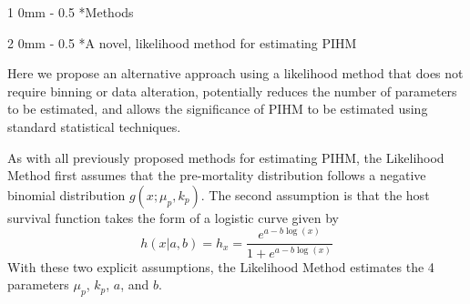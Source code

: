 \documentclass[12pt, a4paper]{article}
\makeatletter
\renewcommand{\section}{\@startsection
{section}%
{1}%
{0mm}%
{-\baselineskip}%
{0.5\baselineskip}%
{\normalfont\bf\large}} %
\renewcommand{\subsection}{\@startsection
{subsection}%
{2}%
{0mm}%
{-\baselineskip}%
{0.5\baselineskip}%
{\normalfont\bf}} %
\makeatother
\begin{document}


\section*{Methods}

\subsection*{A novel, likelihood method for estimating PIHM}

Here we propose an alternative approach using a likelihood method that does not
require binning or data alteration, potentially reduces the number of
parameters to be estimated, and allows the significance of PIHM to be estimated
using standard statistical techniques.

As with all previously proposed methods for estimating PIHM, the
Likelihood Method first assumes that the pre-mortality distribution follows a
negative binomial distribution $g(x; \mu_p, k_p)$.  The second
assumption is that the host survival function
takes the form of a logistic curve given by
\begin{equation}
    h(x | a, b) = h_x = \dfrac{e^{a - b \log(x)}}{1 + e^{a - b \log(x)}}
    \label{eq:logistic}
\end{equation}
With these two explicit assumptions, the Likelihood Method estimates the 4 parameters $\mu_p$, $k_p$, $a$, and $b$.
\end{document}
